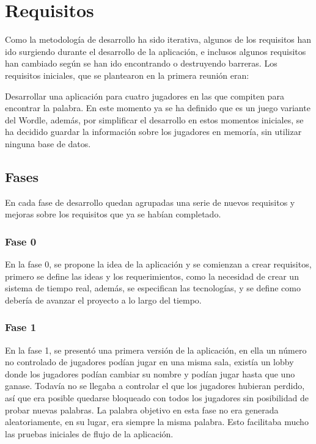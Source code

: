 \section{Requisitos}


Como la metodología de desarrollo ha sido iterativa, algunos de los requisitos han ido surgiendo durante el desarrollo de la aplicación, e inclusos algunos requisitos han cambiado según se han ido encontrando o destruyendo barreras. Los requisitos iniciales, que se plantearon en la primera reunión eran:

Desarrollar una aplicación para cuatro jugadores en las que compiten para encontrar la palabra. En este momento ya se ha definido que es un juego variante del Wordle, además, por simplificar el desarrollo en estos momentos iniciales, se ha decidido guardar la información sobre los jugadores en memoría, sin utilizar ninguna base de datos.

\subsection{Fases}
En cada fase de desarrollo quedan agrupadas una serie de nuevos requisitos y mejoras sobre los requisitos que ya se habían completado.

\subsubsection{Fase 0}
En la fase 0, se propone la idea de la aplicación y se comienzan a crear requisitos, primero se define las ideas y los requerimientos, como la necesidad de crear un sistema de tiempo real, además, se especifican las tecnologías, y se define como debería de avanzar el proyecto a lo largo del tiempo.

\subsubsection{Fase 1}
En la fase 1, se presentó una primera versión de la aplicación, en ella un número no controlado de jugadores podían jugar en una misma sala, existía un lobby donde los jugadores podían cambiar su nombre y podían jugar hasta que uno ganase. Todavía no se llegaba a controlar el que los jugadores hubieran perdido, así que era posible quedarse bloqueado con todos los jugadores sin posibilidad de probar nuevas palabras.
La palabra objetivo en esta fase no era generada aleatoriamente, en su lugar, era siempre la misma palabra. Esto facilitaba mucho las pruebas iniciales de flujo de la aplicación.

